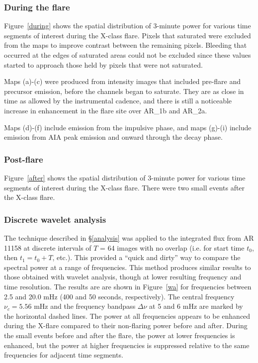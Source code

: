 \subsubsection{During the flare}

Figure~\ref{during}
shows the spatial distribution of 3-minute power for
various time segments of interest during the X-class flare.
Pixels that saturated were excluded from the maps
to improve contrast between the remaining pixels.
Bleeding that occurred at the edges of saturated areas could not
be excluded since these values started to approach those held
by pixels that were not saturated.

Maps (a)-(c) were produced from intensity images that
included pre-flare and precursor emission, before the channels
began to saturate.
They are as close in time as allowed by the instrumental cadence,
and there is still a noticeable increase in enhancement in the flare site
over AR\_1b and AR\_2a.

Maps (d)-(f) include emission from the impulsive phase,
and maps (g)-(i) include emission from AIA peak emission and
onward through the decay phase.


\subsubsection{Post-flare}

Figure~\ref{after}
shows the spatial distribution of 3-minute power for
various time segments of interest during the X-class flare.
There were two small events after the X-class flare.

\subsubsection{Discrete wavelet analysis}

The technique described in \S\ref{analysis} was applied
to the integrated flux from AR 11158 at
discrete intervals of $T$ = 64 images with no overlap
(i.e. for start time $t_{0}$, then $t_{1} = t_{0}+T$, etc.).
This provided a ``quick and dirty'' way
to compare the spectral power at a range of frequencies.
This method produces similar results to those
obtained with wavelet analysis, though
at lower resulting frequency and time resolution.
The results are are shown in
Figure~\ref{wa}
for frequencies between 2.5 and 20.0 mHz (400 and 50 seconds, respectively).
The central frequency $\nu_{c} = 5.56$ mHz
and the frequency bandpass $\Delta\nu$ at 5 and 6 mHz
are marked by the horizontal dashed lines.
The power at all frequencies
appears to be enhanced during the X-flare compared to their
non-flaring power before and after.
During the small events before and after the flare,
the power at lower frequencies is enhanced,
but the power at higher frequencies is suppressed relative to
the same frequencies for adjacent time segments.

